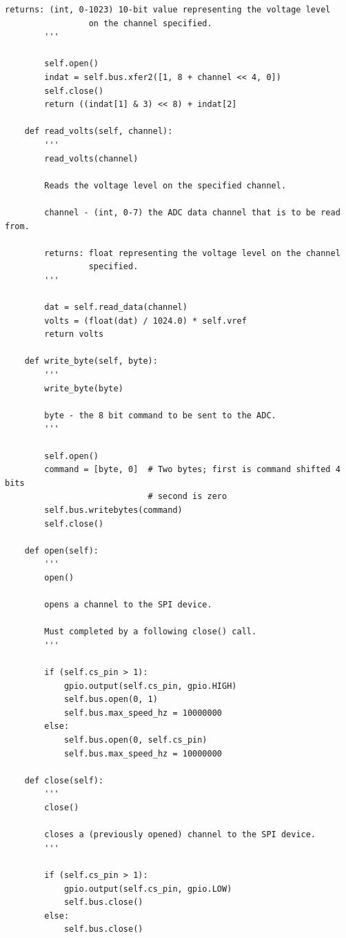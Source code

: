 \documentclass[twoside,a4]{report}
\begin{document}
\begin{Verbatim}[frame=single]
		returns: (int, 0-1023) 10-bit value representing the voltage level 
		         on the channel specified.
		'''
		
		self.open()
		indat = self.bus.xfer2([1, 8 + channel << 4, 0])
		self.close()
		return ((indat[1] & 3) << 8) + indat[2]
	
	def read_volts(self, channel):
		'''
		read_volts(channel)
		
		Reads the voltage level on the specified channel.
		
		channel - (int, 0-7) the ADC data channel that is to be read from.
		
		returns: float representing the voltage level on the channel 
		         specified.
		'''
		
		dat = self.read_data(channel)
		volts = (float(dat) / 1024.0) * self.vref
		return volts
	
	def write_byte(self, byte):
		'''
		write_byte(byte)
		
		byte - the 8 bit command to be sent to the ADC.
		'''
		
		self.open()
		command = [byte, 0]  # Two bytes; first is command shifted 4 bits
		                     # second is zero
		self.bus.writebytes(command)
		self.close()
	
	def open(self):
		'''
		open()
		
		opens a channel to the SPI device.
		
		Must completed by a following close() call.
		'''
		
		if (self.cs_pin > 1):
			gpio.output(self.cs_pin, gpio.HIGH)
			self.bus.open(0, 1)
			self.bus.max_speed_hz = 10000000
		else:
			self.bus.open(0, self.cs_pin)
			self.bus.max_speed_hz = 10000000
	
	def close(self):
		'''
		close()
		
		closes a (previously opened) channel to the SPI device.
		'''
		
		if (self.cs_pin > 1):
			gpio.output(self.cs_pin, gpio.LOW)
			self.bus.close()
		else:
			self.bus.close()
\end{Verbatim}
\end{document}
